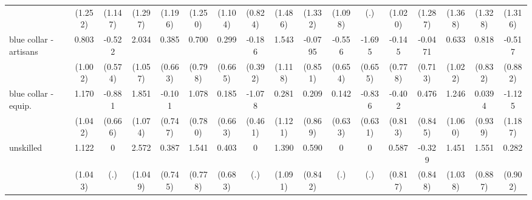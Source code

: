 {\begin{tabular}{l*{16}{c}}
                    &     (1.252)         &     (1.147)         &     (1.297)         &     (1.196)         &     (1.250)         &     (1.104)         &     (0.824)         &     (1.486)         &     (1.332)         &     (1.098)         &         (.)         &     (1.020)         &     (1.287)         &     (1.368)         &     (1.328)         &     (1.316)         \\
[1em]
blue collar - artisans&       0.803         &      -0.522         &       2.034         &       0.385         &       0.700         &       0.299         &      -0.186         &       1.543         &     -0.0795         &      -0.556         &      -1.695\sym{**} &      -0.145         &     -0.0471         &       0.633         &       0.818         &      -0.517         \\
                    &     (1.002)         &     (0.574)         &     (1.057)         &     (0.663)         &     (0.798)         &     (0.665)         &     (0.392)         &     (1.118)         &     (0.851)         &     (0.654)         &     (0.655)         &     (0.778)         &     (0.713)         &     (1.022)         &     (0.832)         &     (0.882)         \\
[1em]
blue collar - equip.&       1.170         &      -0.881         &       1.851         &      -0.101         &       1.078         &       0.185         &      -1.078\sym{*}  &       0.281         &       0.209         &       0.142         &      -0.836         &      -0.402         &       0.476         &       1.246         &      0.0394         &      -1.125         \\
                    &     (1.042)         &     (0.666)         &     (1.074)         &     (0.747)         &     (0.780)         &     (0.663)         &     (0.461)         &     (1.121)         &     (0.869)         &     (0.633)         &     (0.631)         &     (0.813)         &     (0.845)         &     (1.060)         &     (0.939)         &     (1.187)         \\
[1em]
unskilled           &       1.122         &           0         &       2.572\sym{*}  &       0.387         &       1.541\sym{*}  &       0.403         &           0         &       1.390         &       0.590         &           0         &           0         &       0.587         &      -0.329         &       1.451         &       1.551         &       0.282         \\
                    &     (1.043)         &         (.)         &     (1.049)         &     (0.745)         &     (0.778)         &     (0.683)         &         (.)         &     (1.091)         &     (0.842)         &         (.)         &         (.)         &     (0.817)         &     (0.848)         &     (1.038)         &     (0.887)         &     (0.902)         \\

\end{tabular}}
